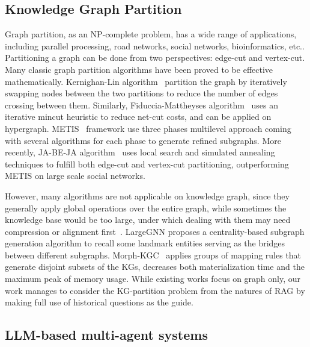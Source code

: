 \documentclass[sigconf]{acmart}
\begin{document}
\subsection{Knowledge Graph Partition}

Graph partition, as an NP-complete problem, has a wide range of applications, including parallel processing, road networks, social networks, bioinformatics, etc.\cite{bulucc2016recent, kim2011genetic}. Partitioning a graph can be done from two perspectives: edge-cut and vertex-cut. Many classic graph partition algorithms have been proved to be effective mathematically. Kernighan-Lin algorithm~\cite{kernighan1970efficient} partition the graph by iteratively swapping nodes between the two partitions to reduce the number of edges crossing between them. Similarly, Fiduccia-Mattheyses algorithm~\cite{fiduccia1988linear} uses an iterative mincut heuristic to reduce net-cut costs, and can be applied on hypergraph. METIS~\cite{karypis1997metis} framework use three phases multilevel approach coming with several algorithms for each phase to generate refined subgraphs. More recently, JA-BE-JA algorithm~\cite{rahimian2015distributed} uses local search and simulated annealing techniques to fulfill both edge-cut and vertex-cut partitioning, outperforming METIS on large scale social networks. 

However, many algorithms are not applicable on knowledge graph, since they generally apply global operations over the entire graph, while sometimes the knowledge base would be too large, under which dealing with them may need compression or alignment first~\cite{qin2020g, trisedya2023align}. LargeGNN proposes a centrality-based subgraph generation algorithm to recall some landmark entities serving as the bridges between different subgraphs. Morph-KGC~\cite{arenas2024morph} applies groups of mapping rules that generate disjoint subsets of the KGs, decreases both materialization time and the maximum peak of memory usage. While existing works focus on graph only, our work manages to consider the KG-partition problem from the natures of RAG by making full use of historical questions as the guide.


\subsection{LLM-based multi-agent systems}
\end{document}
